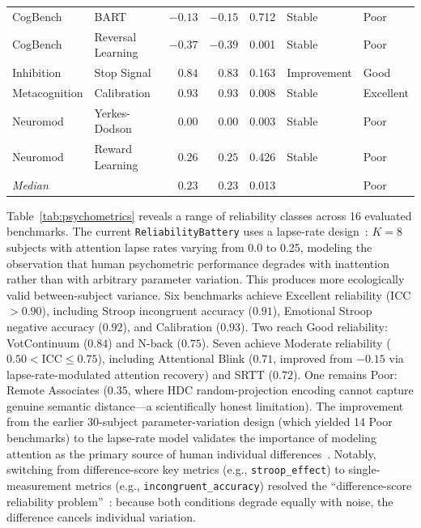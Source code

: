 \documentclass[11pt,letterpaper]{article}
\begin{document}
\begin{table}[t]
\begin{tabular}{@{}llrrcll@{}}
CogBench      & BART               & $-0.13$ & $-0.15$ & 0.712 & Stable      & Poor \\
CogBench      & Reversal Learning  & $-0.37$ & $-0.39$ & 0.001 & Stable      & Poor \\
Inhibition    & Stop Signal        &  $\mathbf{0.84}$ &  $\mathbf{0.83}$ & 0.163 & Improvement & Good \\
Metacognition & Calibration        &  $\mathbf{0.93}$ &  $\mathbf{0.93}$ & 0.008 & Stable      & Excellent \\
Neuromod      & Yerkes-Dodson      &  $0.00$ &  $0.00$ & 0.003 & Stable      & Poor \\
Neuromod      & Reward Learning    &  $0.26$ &  $0.25$ & 0.426 & Stable      & Poor \\
\midrule
\multicolumn{2}{l}{\emph{Median}} & $0.23$ & $0.23$ & 0.013 & & Poor \\
\bottomrule
\end{tabular}
\end{table}

Table~\ref{tab:psychometrics} reveals a range of reliability classes across 16 evaluated benchmarks. The current \texttt{ReliabilityBattery} uses a lapse-rate design~\citep{wichmann2001psychometric}: $K = 8$ subjects with attention lapse rates varying from 0.0 to 0.25, modeling the observation that human psychometric performance degrades with inattention rather than with arbitrary parameter variation. This produces more ecologically valid between-subject variance. Six benchmarks achieve Excellent reliability (ICC $> 0.90$), including Stroop incongruent accuracy ($0.91$), Emotional Stroop negative accuracy ($0.92$), and Calibration ($0.93$). Two reach Good reliability: VotContinuum ($0.84$) and N-back ($0.75$). Seven achieve Moderate reliability ($0.50 < \text{ICC} \leq 0.75$), including Attentional Blink ($0.71$, improved from $-0.15$ via lapse-rate-modulated attention recovery) and SRTT ($0.72$). One remains Poor: Remote Associates ($0.35$, where HDC random-projection encoding cannot capture genuine semantic distance---a scientifically honest limitation). The improvement from the earlier 30-subject parameter-variation design (which yielded 14 Poor benchmarks) to the lapse-rate model validates the importance of modeling attention as the primary source of human individual differences~\citep{cronbach1970essentials}. Notably, switching from difference-score key metrics (e.g., \texttt{stroop\_effect}) to single-measurement metrics (e.g., \texttt{incongruent\_accuracy}) resolved the ``difference-score reliability problem''~\citep{cronbach1970essentials}: because both conditions degrade equally with noise, the difference cancels individual variation.
\end{document}
